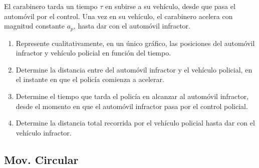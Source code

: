 \documentclass[letterpaper,11pt]{article}
\begin{document}
\begin{enumerate}
El carabinero tarda un tiempo $\tau$ en subirse a su vehículo, desde que pasa el automóvil por el control. Una vez en su vehículo, el carabinero acelera con magnitud constante $a_p$, hasta dar con el automóvil infractor.

\begin{enumerate}
    \item Represente cualitativamente, en un único gráfico, las posiciones del automóvil infractor y vehículo policial en función del tiempo.
    \item Determine la distancia entre del automóvil infractor y el vehículo policial, en el instante en que el policía comienza a acelerar.
    \item Determine el tiempo que tarda el policía en alcanzar al automóvil infractor, desde el momento en que el automóvil infractor pasa por el control policial.
    \item Determine la distancia total recorrida por el vehículo policial hasta dar con el vehículo infractor.
\end{enumerate}

\end{enumerate}
\subsection*{Mov. Circular}
\end{document}

